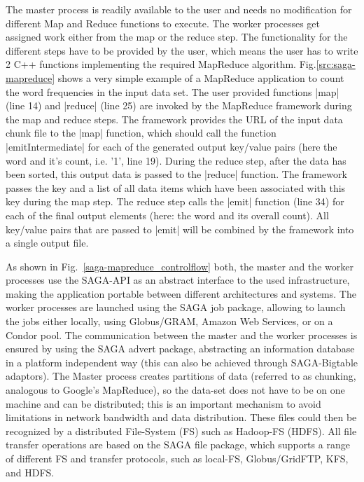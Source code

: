 \documentclass[conference,final]{IEEEtran}
\begin{document}
The master process is readily available to the user and needs no
modification for different Map and Reduce functions to execute.  The
worker processes get assigned work either from the map or the reduce
step. The functionality for the different steps have to be provided by
the user, which means the user has to write 2 C++ functions
implementing the required MapReduce algorithm.
Fig.\ref{src:saga-mapreduce} shows a very simple example of a
MapReduce application to count the word frequencies in the input data
set. The user provided functions |map| (line 14) and |reduce| (line
25) are invoked by the MapReduce framework during the map and reduce
steps. The framework provides the URL of the input data chunk file to
the |map| function, which should call the function |emitIntermediate|
for each of the generated output key/value pairs (here the word and
it's count, i.e. '1', line 19). During the reduce step, after the data
has been sorted, this output data is passed to the |reduce|
function. The framework passes the key and a list of all data items
which have been associated with this key during the map step. The
reduce step calls the |emit| function (line 34) for each of the final
output elements (here: the word and its overall count). All key/value
pairs that are passed to |emit| will be combined by the framework into
a single output file.

As shown in Fig.~\ref{saga-mapreduce_controlflow} both, the master and
the worker processes use the SAGA-API as an abstract interface to the
used infrastructure, making the application portable between different
architectures and systems. The worker processes are launched using the
SAGA job package, allowing to launch the jobs either locally, using
Globus/GRAM, Amazon Web Services, or on a Condor pool. The
communication between the master and the worker processes is ensured
by using the SAGA advert package, abstracting an information database
in a platform independent way (this can also be achieved through
SAGA-Bigtable adaptors).  The Master process creates partitions of
data (referred to as chunking, analogous to Google's MapReduce), so
the data-set does not have to be on one machine and can be
distributed; this is an important mechanism to avoid limitations in
network bandwidth and data distribution.  These files could then be
recognized by a distributed File-System (FS) such as Hadoop-FS
(HDFS). All file transfer operations are based on the SAGA file
package, which supports a range of different FS and transfer
protocols, such as local-FS, Globus/GridFTP, KFS, and HDFS.
\end{document}
